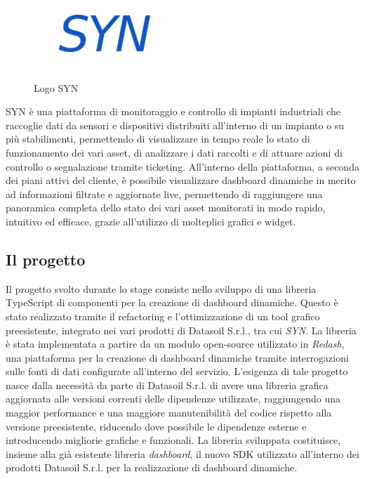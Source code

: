 \begin{figure}[H]
      \centering
      \includegraphics[alt={Logo SYN}, width=0.25\columnwidth]{img/syn_logo.jpg}
      \caption{Logo SYN}
      \label{fig:syn}
\end{figure}

SYN è una piattaforma di monitoraggio e controllo di impianti industriali che raccoglie dati da sensori e dispositivi
distribuiti all'interno di un impianto o su più stabilimenti, permettendo di visualizzare in tempo reale lo stato di
funzionamento dei vari asset, di analizzare i dati raccolti e di attuare azioni di controllo o segnalazione tramite
ticketing. All'interno della piattaforma, a seconda dei piani attivi del cliente, è possibile visualizzare dashboard dinamiche
in merito ad informazioni filtrate e aggiornate live, permettendo di raggiungere una panoramica completa dello stato dei vari
asset monitorati in modo rapido, intuitivo ed efficace, grazie all'utilizzo di molteplici grafici e widget.

\subsection{Il progetto}
Il progetto svolto durante lo stage consiste nello sviluppo di una libreria TypeScript di componenti per la creazione di dashboard dinamiche.
Questo è stato realizzato tramite il refactoring e l'ottimizzazione di un tool grafico preesistente, integrato nei vari prodotti di Datasoil S.r.l.,
tra cui \textit{SYN}. La libreria è stata implementata a partire da un modulo open-source utilizzato in \textit{Redash},
una piattaforma per la creazione di dashboard dinamiche tramite interrogazioni sulle fonti di dati configurate all'interno del servizio. \newline
L'esigenza di tale progetto nasce dalla necessità da parte di Datasoil S.r.l. di avere una libreria grafica aggiornata alle versioni
correnti delle dipendenze utilizzate, raggiungendo una maggior performance e una maggiore manutenibilità del codice rispetto alla versione
preesistente, riducendo dove possibile le dipendenze esterne e introducendo migliorie grafiche e funzionali.
La libreria sviluppata costituisce, insieme alla già esistente libreria \textit{dashboard}, il nuovo SDK utilizzato all'interno dei prodotti
Datasoil S.r.l. per la realizzazione di dashboard dinamiche.

